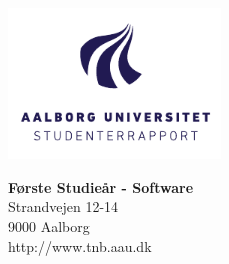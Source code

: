 

{}
\thispagestyle{empty}

\begin{minipage}[t]{0.48\textwidth}
    \vspace*{-25pt}			%
    \includegraphics[height=4cm]{0_billeder/AAU-logo-stud-DK-RGB}
    \end{minipage}
    \hfill
    \begin{minipage}[t]{0.48\textwidth} {
        \small 
        \textbf{Første Studieår - Software} \\
        Strandvejen 12-14 \\
        9000 Aalborg \\
        http://www.tnb.aau.dk
    }
\end{minipage}

\vspace*{1cm}

